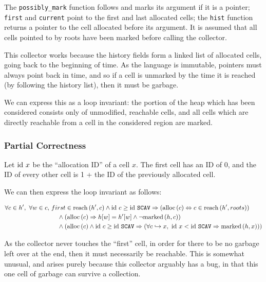 The \texttt{possibly\_mark} function follows and marks its argument if
it is a pointer; \texttt{first} and \texttt{current} point to the
first and last allocated \glspl{cell}; the \texttt{hist} function
returns a \gls{pointer} to the \gls{cell} allocated before its
argument. It is assumed that all cells pointed to by roots have been
marked before calling the collector.

This \gls{collector} works because the history fields form a linked
list of allocated \glspl{cell}, going back to the beginning of
time. As the language is immutable, \glspl{pointer} must always point
back in time, and so if a \gls{cell} is unmarked by the time it is
reached (by following the history list), then it must be
\gls{garbage}.

We can express this as a \gls{loop invariant}: the portion of the
\gls{heap} which has been considered consists only of unmodified,
reachable \glspl{cell}, and all \glspl{cell} which are directly
reachable from a \gls{cell} in the considered region are marked.

\subsubsection{Partial Correctness}
\label{sec:marksweep-example-partial}

Let $\mathrm{id}~x$ be the ``allocation ID'' of a cell $x$. The first cell has
an ID of 0, and the ID of every other cell is 1 + the ID of the
previously allocated cell.

We can then express the \gls{loop invariant} as follows:

\begin{align*}
  \forall c \in h',\ \forall w \in c,\ &first \in \mathrm{reach}\left(h', c\right) \land
  \mathrm{id}~c \geq \mathrm{id}~\mathtt{SCAV} \Rightarrow (\mathrm{alloc}\left(c\right) \Leftrightarrow c \in
  \mathrm{reach}\left(h', roots\right))\\
  &\quad\land (\mathrm{alloc}\left(c\right) \Rightarrow h[w] = h'[w] \land \lnot
  \mathrm{marked}\left(h, c\right))\\
  &\quad\land (\mathrm{alloc}\left(c\right) \land \mathrm{id}~c \geq \mathrm{id}~\mathtt{SCAV} \Rightarrow
  (\forall c \hookrightarrow x,\ \mathrm{id}~x < \mathrm{id}~\mathtt{SCAV} \Rightarrow
  \mathrm{marked}\left(h, x\right)))
\end{align*}

As the \gls{collector} never touches the ``first'' \gls{cell}, in
order for there to be no \gls{garbage} left over at the end, then it
must necessarily be reachable. This is somewhat unusual, and arises
purely because this \gls{collector} arguably has a bug, in that this
one \gls{cell} of \gls{garbage} can survive a collection.

